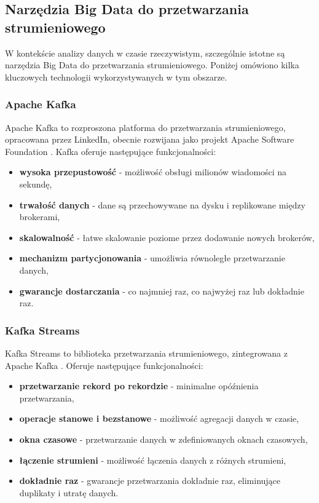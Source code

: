 \subsection{Narzędzia Big Data do przetwarzania strumieniowego}
\label{subsec:narzedzia_big_data}

W kontekście analizy danych w czasie rzeczywistym, szczególnie istotne są narzędzia Big Data do przetwarzania strumieniowego.
Poniżej omówiono kilka kluczowych technologii wykorzystywanych w tym obszarze.

\subsubsection{Apache Kafka}
\label{subsubsec:apache_kafka}

Apache Kafka to rozproszona platforma do przetwarzania strumieniowego, opracowana przez LinkedIn, obecnie rozwijana jako projekt
Apache Software Foundation \citep{kafka}. Kafka oferuje następujące funkcjonalności:

\begin{itemize}
    \item \textbf{wysoka przepustowość} - możliwość obsługi milionów wiadomości na sekundę,
    \item \textbf{trwałość danych} - dane są przechowywane na dysku i replikowane między brokerami,
    \item \textbf{skalowalność} - łatwe skalowanie poziome przez dodawanie nowych brokerów,
    \item \textbf{mechanizm partycjonowania} - umożliwia równoległe przetwarzanie danych,
    \item \textbf{gwarancje dostarczania} - co najmniej raz, co najwyżej raz lub dokładnie raz.
\end{itemize}

\subsubsection{Kafka Streams}
\label{subsubsec:kafka_streams}

Kafka Streams to biblioteka przetwarzania strumieniowego, zintegrowana z Apache Kafka \citep{kafka_streams}. Oferuje następujące funkcjonalności:

\begin{itemize}
    \item \textbf{przetwarzanie rekord po rekordzie} - minimalne opóźnienia przetwarzania,
    \item \textbf{operacje stanowe i bezstanowe} - możliwość agregacji danych w czasie,
    \item \textbf{okna czasowe} - przetwarzanie danych w zdefiniowanych oknach czasowych,
    \item \textbf{łączenie strumieni} - możliwość łączenia danych z różnych strumieni,
    \item \textbf{dokładnie raz} - gwarancje przetwarzania dokładnie raz, eliminujące duplikaty i utratę danych.
\end{itemize}


